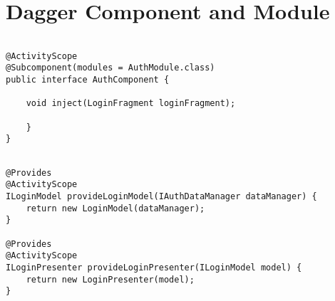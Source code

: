 \chapter{Dagger Component and Module}
    
\begin{lstlisting}[caption=Dagger Component example,frame=tlrb,basicstyle=\small,captionpos=b]
    
@ActivityScope
@Subcomponent(modules = AuthModule.class)
public interface AuthComponent {

    void inject(LoginFragment loginFragment);
    
    }
}
\end{lstlisting}

\begin{lstlisting}[caption= Dagger Module example,frame=tlrbr,basicstyle=\small,captionpos=b]
    
@Provides
@ActivityScope
ILoginModel provideLoginModel(IAuthDataManager dataManager) {
    return new LoginModel(dataManager);
}

@Provides
@ActivityScope
ILoginPresenter provideLoginPresenter(ILoginModel model) {
    return new LoginPresenter(model);
}
\end{lstlisting}





  